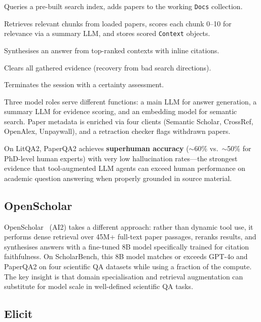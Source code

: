 \documentclass[11pt,a4paper]{article}
\begin{document}
\begin{description}[nosep, style=nextline, labelwidth=3cm, leftmargin=3.5cm]
  \item[\texttt{PaperSearch}] Queries a pre-built search index, adds
    papers to the working \texttt{Docs} collection.
  \item[\texttt{GatherEvidence}] Retrieves relevant chunks from loaded
    papers, scores each chunk 0--10 for relevance via a summary LLM,
    and stores scored \texttt{Context} objects.
  \item[\texttt{GenerateAnswer}] Synthesises an answer from top-ranked
    contexts with inline citations.
  \item[\texttt{Reset}] Clears all gathered evidence (recovery from bad
    search directions).
  \item[\texttt{Complete}] Terminates the session with a certainty
    assessment.
\end{description}

\noindent
Three model roles serve different functions: a main LLM for answer
generation, a summary LLM for evidence scoring, and an embedding model
for semantic search. Paper metadata is enriched via four clients
(Semantic Scholar, CrossRef, OpenAlex, Unpaywall), and a retraction
checker flags withdrawn papers.

On LitQA2, PaperQA2 achieves \textbf{superhuman accuracy}
($\sim$60\% vs.\ $\sim$50\% for PhD-level human experts) with very low
hallucination rates---the strongest evidence that tool-augmented LLM
agents can exceed human performance on academic question answering when
properly grounded in source material.

\subsection{OpenScholar}

OpenScholar~\citep{openscholar2024} (AI2) takes a different approach:
rather than dynamic tool use, it performs dense retrieval over 45M+
full-text paper passages, reranks results, and synthesises answers with
a fine-tuned 8B model specifically trained for citation faithfulness.
On ScholarBench, this 8B model matches or exceeds GPT-4o and PaperQA2
on four scientific QA datasets while using a fraction of the compute.
The key insight is that domain specialisation and retrieval
augmentation can substitute for model scale in well-defined scientific
QA tasks.

\subsection{Elicit}
\end{document}
